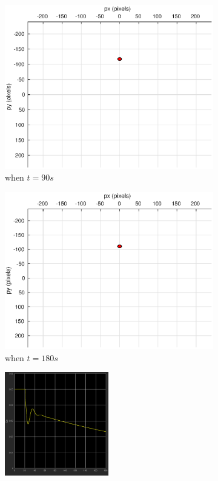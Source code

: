 \begin{figure}
\begin{subfigure}[b]{0.32\linewidth}
		\includegraphics[width=\textwidth]{images/chapter4/inertial_camera_5mps_90s}
		\caption{when $t=90s$}
	\end{subfigure}
	\begin{subfigure}[b]{0.32\linewidth}
		\includegraphics[width=\textwidth]{images/chapter4/inertial_camera_5mps_180s}
		\caption{when $t=180s$}
	\end{subfigure}	
	\begin{subfigure}[b]{0.8\linewidth}
		\centering
		\includegraphics[width=0.5\textwidth]{images/chapter4/inertial_Ex_5mps}

\end{subfigure}
\end{figure}
